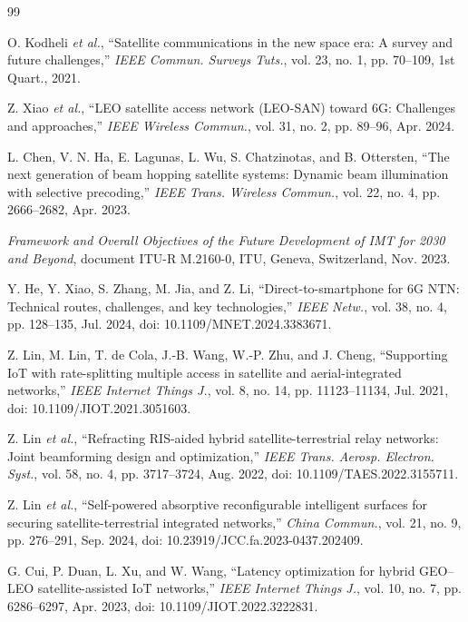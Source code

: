 \documentclass[journal]{IEEEtran}
\begin{document}
\begin{thebibliography}{99}

 O. Kodheli \textit{et al.}, ``Satellite communications in the new space era: A survey and future challenges,'' \textit{IEEE Commun. Surveys Tuts.}, vol. 23, no. 1, pp. 70--109, 1st Quart., 2021.

 Z. Xiao \textit{et al.}, ``LEO satellite access network (LEO-SAN) toward 6G: Challenges and approaches,'' \textit{IEEE Wireless Commun.}, vol. 31, no. 2, pp. 89--96, Apr. 2024.

 L. Chen, V. N. Ha, E. Lagunas, L. Wu, S. Chatzinotas, and B. Ottersten, ``The next generation of beam hopping satellite systems: Dynamic beam illumination with selective precoding,'' \textit{IEEE Trans. Wireless Commun.}, vol. 22, no. 4, pp. 2666--2682, Apr. 2023.

 \textit{Framework and Overall Objectives of the Future Development of IMT for 2030 and Beyond}, document ITU-R M.2160-0, ITU, Geneva, Switzerland, Nov. 2023.

 Y. He, Y. Xiao, S. Zhang, M. Jia, and Z. Li, ``Direct-to-smartphone for 6G NTN: Technical routes, challenges, and key technologies,'' \textit{IEEE Netw.}, vol. 38, no. 4, pp. 128--135, Jul. 2024, doi: 10.1109/MNET.2024.3383671.

 Z. Lin, M. Lin, T. de Cola, J.-B. Wang, W.-P. Zhu, and J. Cheng, ``Supporting IoT with rate-splitting multiple access in satellite and aerial-integrated networks,'' \textit{IEEE Internet Things J.}, vol. 8, no. 14, pp. 11123--11134, Jul. 2021, doi: 10.1109/JIOT.2021.3051603.

 Z. Lin \textit{et al.}, ``Refracting RIS-aided hybrid satellite-terrestrial relay networks: Joint beamforming design and optimization,'' \textit{IEEE Trans. Aerosp. Electron. Syst.}, vol. 58, no. 4, pp. 3717--3724, Aug. 2022, doi: 10.1109/TAES.2022.3155711.

 Z. Lin \textit{et al.}, ``Self-powered absorptive reconfigurable intelligent surfaces for securing satellite-terrestrial integrated networks,'' \textit{China Commun.}, vol. 21, no. 9, pp. 276--291, Sep. 2024, doi: 10.23919/JCC.fa.2023-0437.202409.

 G. Cui, P. Duan, L. Xu, and W. Wang, ``Latency optimization for hybrid GEO--LEO satellite-assisted IoT networks,'' \textit{IEEE Internet Things J.}, vol. 10, no. 7, pp. 6286--6297, Apr. 2023, doi: 10.1109/JIOT.2022.3222831.


\end{thebibliography}
\end{document}
